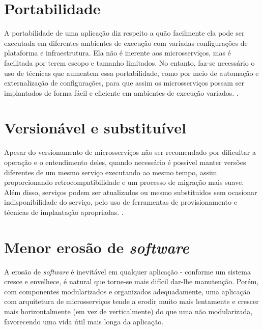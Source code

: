 \section{Portabilidade}\label{sec:portabilidade} %

A portabilidade de uma aplicação diz respeito a quão facilmente ela pode ser executada em diferentes ambientes de execução com variadas configurações de plataforma e infraestrutura. Ela não é inerente aos microsserviços, mas é facilitada por terem escopo e tamanho limitados. No entanto, faz-se necessário o uso de técnicas que aumentem essa portabilidade, como por meio de automação e externalização de configurações, para que assim os microsserviços possam ser implantados de forma fácil e eficiente em ambientes de execução variados. \cite{Familiar2015}.

\section{Versionável e substituível}

Apesar do versionamento de microsserviços não ser recomendado por dificultar a operação e o entendimento deles, quando necessário é possível manter versões diferentes de um mesmo serviço executando ao mesmo tempo, assim proporcionando retrocompatibilidade e um processo de migração mais suave. Além disso, serviços podem ser atualizados ou mesmo substituidos sem ocasionar indisponibilidade do serviço, pelo uso de ferramentas de provisionamento e técnicas de implantação apropriadas. \cite{Familiar2015}.

\section{Menor erosão de \emph{software}}

A erosão de \emph{software} é inevitável em qualquer aplicação - conforme um sistema cresce e envelhece, é natural que torne-se mais difícil dar-lhe manutenção. Porém, com componentes modularizados e organizados adequadamente, uma aplicação com arquitetura de microsserviços tende a erodir muito mais lentamente e crescer mais horizontalmente (em vez de verticalmente) do que uma não modularizada, favorecendo uma vida útil mais longa da aplicação.


